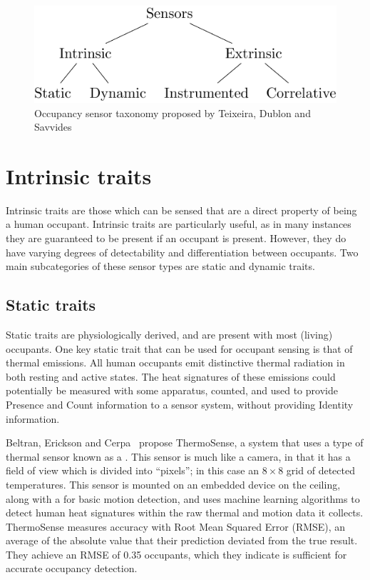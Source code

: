 \documentclass[../thesis/thesis.tex]{subfiles}
\begin{document}
\begin{figure}
\centering
\includegraphics{../diagrams/category-tree.pdf}
\caption{Occupancy sensor taxonomy proposed by Teixeira, Dublon and Savvides~\cite{teixeira2010survey}}
\label{fig:litreview:taxonomy}
\end{figure}

\section{Intrinsic traits}
\label{subsec:litreview:sensors:intrinsic}

Intrinsic traits are those which can be sensed that are a direct property of being a human occupant. Intrinsic traits are particularly useful, as in many instances they are guaranteed to be present if an occupant is present. However, they do have varying degrees of detectability and differentiation between occupants. Two main subcategories of these sensor types are static and dynamic traits.

\subsection{Static traits}
\label{subsubsec:litreview:sensors:intrinsic:static}
Static traits are physiologically derived, and are present with most (living) occupants. One key static trait that can be used for occupant sensing is that of thermal emissions. All human occupants emit distinctive thermal radiation in both resting and active states. The heat signatures of these emissions could potentially be measured with some apparatus, counted, and used to provide Presence and Count information to a sensor system, without providing Identity information.

Beltran, Erickson and Cerpa~\cite{beltran2013thermosense} propose ThermoSense, a system that uses a type of thermal sensor known as a \iar. This sensor is much like a camera, in that it has a field of view which is divided into ``pixels''; in this case an $8\times8$ grid of detected temperatures. This sensor is mounted on an embedded device on the ceiling, along with a \pir for basic motion detection, and uses machine learning algorithms to detect human heat signatures within the raw thermal and motion data it collects. ThermoSense measures accuracy with Root Mean Squared Error (RMSE), an average of the absolute value that their prediction deviated from the true result. They achieve an RMSE of 0.35 occupants, which they indicate is sufficient for accurate occupancy detection.
\end{document}
